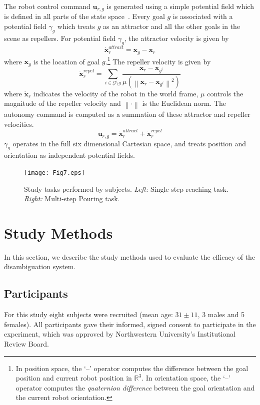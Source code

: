 \documentclass[natbib, twocolumn]{svjour3}          %
\newcommand{\norm}[1]{\left\lVert#1\right\rVert}
\begin{document}
The robot control command $\boldsymbol{u}_{r,g}$ is generated using a simple potential field which is defined in all parts of the state space~\citep{khatib1986real}. Every goal $g$ is associated with a potential field $\gamma_g$ which treats $g$ as an attractor and all the other goals in the scene as repellers. For potential field $\gamma_g$, the attractor velocity is given by
\begin{equation*}
\dot{\boldsymbol{x}}_r^{attract} = \boldsymbol{x}_{g} - \boldsymbol{x}_r
\end{equation*}
where $\boldsymbol{x}_{g}$ is the location of goal $g$.\footnote{In position space, the `--' operator computes the difference between the goal position and current robot position in $\mathbb{R}^3$. In orientation space, the `--' operator computes the \textit{quaternion difference} between the goal orientation and the current robot orientation.} The repeller velocity is given by
\begin{equation*}
\dot{\boldsymbol{x}}_r^{repel} = \sum_{i \in \mathcal{G} \setminus g} \frac{\boldsymbol{x}_r - \boldsymbol{x}_{g^i}}{\mu(\norm{\boldsymbol{x}_r - \boldsymbol{x}_{g^i}}^2)}
\end{equation*}
where $\dot{\boldsymbol{x}}_r$ indicates the velocity of the robot in the world frame, $\mu$ controls the magnitude of the repeller velocity and $\norm{\cdot}$ is the Euclidean norm. The autonomy command is computed as a summation of these attractor and repeller velocities.
\begin{equation*}
\boldsymbol{u}_{r,g} = \dot{\boldsymbol{x}}_r^{attract} + \dot{\boldsymbol{x}}_r^{repel} 
\end{equation*}
$\gamma_g$ operates in the full six dimensional Cartesian space, and treats position and orientation as independent potential fields. 


\begin{figure}[ht!]
	\texttt{[image: Fig7.eps]}
	\caption{Study tasks performed by subjects. \textit{Left:} Single-step reaching task. \textit{Right:} Multi-step Pouring task. }
	\label{fig:tasks}
\end{figure}

\section{Study Methods}\label{sec:ed}
In this section, we describe the study methods used to evaluate the efficacy of the disambiguation system. 
\subsection{Participants}
For this study eight subjects were recruited (mean age: $31 \pm 11$, 3 males and 5 females). All participants gave their informed, signed consent to participate in the experiment, which was approved by Northwestern University's Institutional Review Board.
\end{document}
